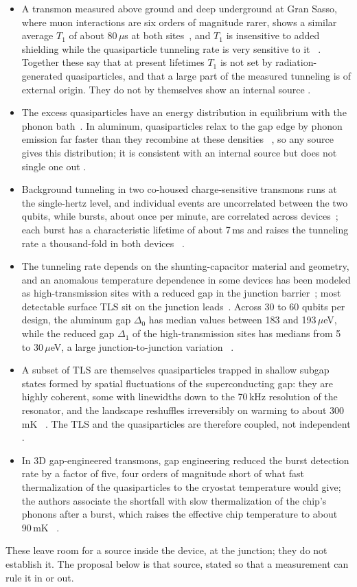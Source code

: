 \begin{itemize}
\item A transmon measured above ground and deep underground at Gran Sasso, where muon interactions are six orders of magnitude rarer, shows a
similar average $T_1$ of about 80\,$\mu$s at both sites~\cite{DeDominicis2026}, and
$T_1$ is insensitive to added shielding while the quasiparticle tunneling rate is very sensitive to it~\cite{Gordon2022} \observed. Together these say that at present
lifetimes $T_1$ is not set by radiation-generated quasiparticles, and that a large part of the measured tunneling is of external origin. They do not
by themselves show an internal source \interp.
\item The excess quasiparticles have an energy distribution in equilibrium with the phonon bath~\cite{Connolly2024}. In aluminum, quasiparticles relax to the gap edge by phonon
emission far faster than they recombine at these densities~\cite{Kaplan1976} \observed, so any source gives this distribution; it is consistent with an internal source but does
not single one out \interp.
\item Background tunneling in two co-housed charge-sensitive transmons runs at the single-hertz level, and individual events are
uncorrelated between the two qubits, while bursts, about once per minute, are correlated across devices~\cite{Sundelin2026,McEwen2022};
each burst has a characteristic lifetime of about 7\,ms and raises the tunneling rate a thousand-fold in both devices~\cite{Sundelin2026}
\observed.
\item The tunneling rate depends on the shunting-capacitor material and geometry, and an anomalous temperature dependence in some devices has been
modeled as high-transmission sites with a reduced gap in the junction barrier~\cite{Kurter2022}; most detectable surface TLS sit on the junction
leads~\cite{Lisenfeld2025}. Across 30 to 60 qubits per design, the aluminum gap $\Delta_0$ has median values between 183 and 193\,$\mu$eV, while the reduced gap
$\Delta_1$ of the high-transmission sites has medians from 5 to 30\,$\mu$eV, a large junction-to-junction variation~\cite{Kurter2022}
\observed.
\item A subset of TLS are themselves quasiparticles trapped in shallow subgap states formed by spatial fluctuations of the
superconducting gap: they are highly coherent, some with linewidths down to the 70\,kHz resolution of the resonator, and the landscape
reshuffles irreversibly on warming to about 300\,mK~\cite{deGraaf2020} \observed. The TLS and the quasiparticles are therefore
coupled, not independent \interp.
\item In 3D gap-engineered transmons, gap engineering reduced the burst detection rate by a factor of five, four orders of magnitude
short of what fast thermalization of the quasiparticles to the cryostat temperature would give; the authors associate the shortfall with
slow thermalization of the chip's phonons after a burst, which raises the effective chip temperature to about 90\,mK~\cite{Nho2026}
\observed.
\end{itemize}
These leave room for a source inside the device, at the junction; they do not establish it. The proposal below is that source, stated so that a
measurement can rule it in or out.

